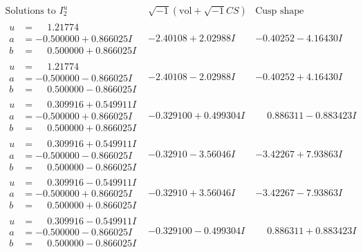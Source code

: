 \documentclass[1p]{elsarticle_modified}
\theoremstyle{definition}
\newcommand{\I}{\sqrt{-1}}
\begin{document}
$$\begin{array}{c|c|c}  
\text{Solutions to }I^u_{2}& \I (\text{vol} + \sqrt{-1}CS) & \text{Cusp shape}\\
 \hline 
\begin{aligned}
u &= \phantom{-}1.21774\phantom{ +0.000000I} \\
a &= -0.500000 + 0.866025 I \\
b &= \phantom{-}0.500000 + 0.866025 I\end{aligned}
 & -2.40108 + 2.02988 I & -0.40252 - 4.16430 I \\ \hline\begin{aligned}
u &= \phantom{-}1.21774\phantom{ +0.000000I} \\
a &= -0.500000 - 0.866025 I \\
b &= \phantom{-}0.500000 - 0.866025 I\end{aligned}
 & -2.40108 - 2.02988 I & -0.40252 + 4.16430 I \\ \hline\begin{aligned}
u &= \phantom{-}0.309916 + 0.549911 I \\
a &= -0.500000 + 0.866025 I \\
b &= \phantom{-}0.500000 + 0.866025 I\end{aligned}
 & -0.329100 + 0.499304 I & \phantom{-}0.886311 - 0.883423 I \\ \hline\begin{aligned}
u &= \phantom{-}0.309916 + 0.549911 I \\
a &= -0.500000 - 0.866025 I \\
b &= \phantom{-}0.500000 - 0.866025 I\end{aligned}
 & -0.32910 - 3.56046 I & -3.42267 + 7.93863 I \\ \hline\begin{aligned}
u &= \phantom{-}0.309916 - 0.549911 I \\
a &= -0.500000 + 0.866025 I \\
b &= \phantom{-}0.500000 + 0.866025 I\end{aligned}
 & -0.32910 + 3.56046 I & -3.42267 - 7.93863 I \\ \hline\begin{aligned}
u &= \phantom{-}0.309916 - 0.549911 I \\
a &= -0.500000 - 0.866025 I \\
b &= \phantom{-}0.500000 - 0.866025 I\end{aligned}
 & -0.329100 - 0.499304 I & \phantom{-}0.886311 + 0.883423 I \\ \hline\begin{aligned}

\end{aligned}
\end{array}$$
\end{document}
